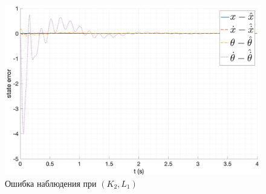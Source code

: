 \begin{figure}[ht!]
    \centering
    \includegraphics[width=\textwidth]{media/plots/nonmodal_observer_controller/kl_err_2.png}
    \caption{Ошибка наблюдения при $(K_2, L_1)$}
    \label{fig:KL_2_err}
\end{figure}
\FloatBarrier

